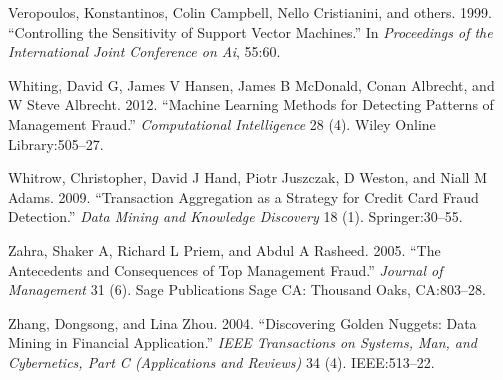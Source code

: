 \documentclass[12pt,]{article}
\begin{document}
\leavevmode\hypertarget{ref-veropoulos1999controlling}{}%
Veropoulos, Konstantinos, Colin Campbell, Nello Cristianini, and others.
1999. ``Controlling the Sensitivity of Support Vector Machines.'' In
\emph{Proceedings of the International Joint Conference on Ai}, 55:60.

\leavevmode\hypertarget{ref-whiting2012machine}{}%
Whiting, David G, James V Hansen, James B McDonald, Conan Albrecht, and
W Steve Albrecht. 2012. ``Machine Learning Methods for Detecting
Patterns of Management Fraud.'' \emph{Computational Intelligence} 28
(4). Wiley Online Library:505--27.

\leavevmode\hypertarget{ref-whitrow2009transaction}{}%
Whitrow, Christopher, David J Hand, Piotr Juszczak, D Weston, and Niall
M Adams. 2009. ``Transaction Aggregation as a Strategy for Credit Card
Fraud Detection.'' \emph{Data Mining and Knowledge Discovery} 18 (1).
Springer:30--55.

\leavevmode\hypertarget{ref-zahra2005antecedents}{}%
Zahra, Shaker A, Richard L Priem, and Abdul A Rasheed. 2005. ``The
Antecedents and Consequences of Top Management Fraud.'' \emph{Journal of
Management} 31 (6). Sage Publications Sage CA: Thousand Oaks,
CA:803--28.

\leavevmode\hypertarget{ref-zhang2004discovering}{}%
Zhang, Dongsong, and Lina Zhou. 2004. ``Discovering Golden Nuggets: Data
Mining in Financial Application.'' \emph{IEEE Transactions on Systems,
Man, and Cybernetics, Part C (Applications and Reviews)} 34 (4).
IEEE:513--22.
\end{document}
